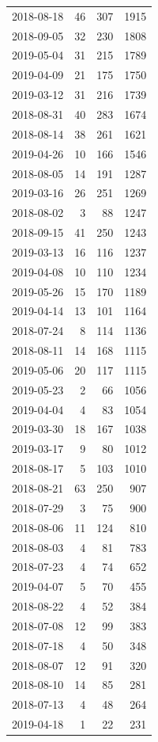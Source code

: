\begin{tabular}{lrrr}
2018-08-18 & 46 & 307 & 1915 \\
2018-09-05 & 32 & 230 & 1808 \\
2019-05-04 & 31 & 215 & 1789 \\
2019-04-09 & 21 & 175 & 1750 \\
2019-03-12 & 31 & 216 & 1739 \\
2018-08-31 & 40 & 283 & 1674 \\
2018-08-14 & 38 & 261 & 1621 \\
2019-04-26 & 10 & 166 & 1546 \\
2018-08-05 & 14 & 191 & 1287 \\
2019-03-16 & 26 & 251 & 1269 \\
2018-08-02 & 3 & 88 & 1247 \\
2018-09-15 & 41 & 250 & 1243 \\
2019-03-13 & 16 & 116 & 1237 \\
2019-04-08 & 10 & 110 & 1234 \\
2019-05-26 & 15 & 170 & 1189 \\
2019-04-14 & 13 & 101 & 1164 \\
2018-07-24 & 8 & 114 & 1136 \\
2018-08-11 & 14 & 168 & 1115 \\
2019-05-06 & 20 & 117 & 1115 \\
2019-05-23 & 2 & 66 & 1056 \\
2019-04-04 & 4 & 83 & 1054 \\
2019-03-30 & 18 & 167 & 1038 \\
2019-03-17 & 9 & 80 & 1012 \\
2018-08-17 & 5 & 103 & 1010 \\
2018-08-21 & 63 & 250 & 907 \\
2018-07-29 & 3 & 75 & 900 \\
2018-08-06 & 11 & 124 & 810 \\
2018-08-03 & 4 & 81 & 783 \\
2018-07-23 & 4 & 74 & 652 \\
2019-04-07 & 5 & 70 & 455 \\
2018-08-22 & 4 & 52 & 384 \\
2018-07-08 & 12 & 99 & 383 \\
2018-07-18 & 4 & 50 & 348 \\
2018-08-07 & 12 & 91 & 320 \\
2018-08-10 & 14 & 85 & 281 \\
2018-07-13 & 4 & 48 & 264 \\
2019-04-18 & 1 & 22 & 231 \\

\end{tabular}
